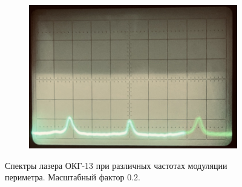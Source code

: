 \documentclass[12pt, russian, a4paper]{article}
\begin{document}
\begin{figure}
\begin{subfigure}[tb]{.32\textwidth}
			\caption{}
			\label{fig:0.2-2}
		\end{subfigure}
    	\hfill
    	\begin{subfigure}[tb]{.32\textwidth}
			\centering
			\includegraphics[width=\textwidth]{../images/3.PNG}
			\caption{}
			\label{fig:0.2-3}
		\end{subfigure}
     	\caption{Спектры лазера ОКГ-13 при различных частотах модуляции периметра. Масштабный фактор 0.2.}
     	\label{fig:0.2}
	\end{figure}
\end{document}
